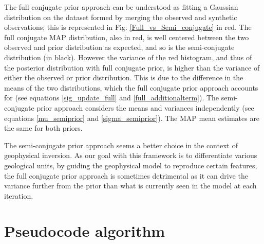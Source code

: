 The full conjugate prior approach can be understood as fitting a Gaussian distribution on the dataset formed by merging the observed and synthetic observations; this is represented in Fig. \ref{Full_vs_Semi_conjugate} in red. The full conjugate MAP distribution, also in red, is well centered between the two observed and prior distribution as expected, and so is the semi-conjugate distribution (in black). However the variance of the red histogram, and thus of the posterior distribution with full conjugate prior, is higher than the variance of either the observed or prior distribution. This is due to the difference in the means of the two distributions, which the full conjugate prior approach accounts for (see equations \ref{sig_update_full} and \ref{full_additionalterm}). The semi-conjugate prior approach considers the means and variances independently (see equations \ref{mu_semiprior} and \ref{sigma_semiprior}). The MAP mean estimates are the same for both priors.

The semi-conjugate prior approach seems a better choice in the context of geophysical inversion. As our goal with this framework is to differentiate various geological units, by guiding the geophysical model to reproduce certain features, the full conjugate prior approach is sometimes detrimental as it can drive the variance further from the prior than what is currently seen in the model at each iteration.


\section{Pseudocode algorithm} \label{section:pseudocode}

